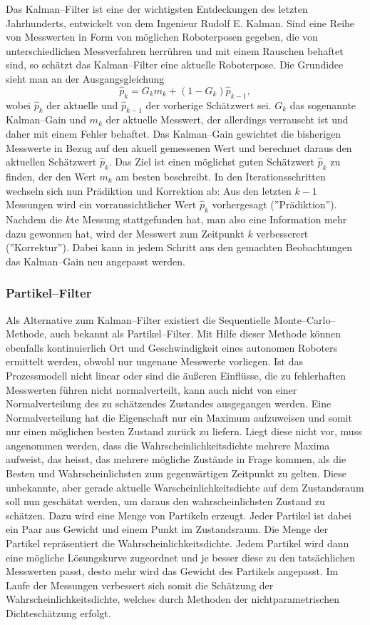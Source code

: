 Das Kalman--Filter ist eine der wichtigsten Entdeckungen des letzten Jahrhunderts, entwickelt von dem Ingenieur Rudolf E. Kalman.
Sind eine Reihe von Messwerten in Form von möglichen Roboterposen gegeben, die von unterschiedlichen Messverfahren herrühren und mit einem Rauschen behaftet sind, so schätzt das Kalman--Filter eine aktuelle Roboterpose.
Die Grundidee sieht man an der Ausgangsgleichung \[ \hat{p}_k = G_k m_k + (1-G_k) \hat{p}_{k-1}, \] wobei \(\hat{p}_k\) der aktuelle und  \(\hat{p}_{k-1}\) der vorherige Schätzwert sei. \(G_k\) das sogenannte Kalman--Gain und \(m_k\) der aktuelle Messwert, der allerdings verrauscht ist und daher mit einem Fehler behaftet. Das Kalman--Gain gewichtet die bisherigen Messwerte in Bezug auf den akuell gemessenen Wert und berechnet daraus den aktuellen Schätzwert \(\hat{p}_k\). Das Ziel ist einen möglichst guten Schätzwert \(\hat{p}_k\) zu finden, der den Wert \(m_k\) am besten beschreibt.
In den Iterationsschritten wechseln sich nun Prädiktion und Korrektion ab: Aus den letzten \(k-1\) Messungen wird ein vorraussichtlicher Wert \(\hat{p}_k\) vorhergesagt (''Prädiktion''). Nachdem die \(k\)te Messung stattgefunden hat, man also eine Information mehr dazu gewonnen hat, wird der Messwert zum Zeitpunkt \(k\) verbesserert (''Korrektur''). Dabei kann in jedem Schritt aus den gemachten Beobachtungen das Kalman--Gain neu angepasst werden.

\subsubsection{Partikel--Filter}

Als Alternative zum Kalman--Filter existiert die Sequentielle
Monte--Carlo--Methode, auch bekannt als Partikel--Filter. Mit Hilfe dieser
Methode können ebenfalls kontinuierlich Ort und Geschwindigkeit eines autonomen Roboters ermittelt werden, obwohl nur ungenaue Messwerte vorliegen.
Ist das Prozessmodell nicht linear oder sind die äußeren Einflüsse, die zu
fehlerhaften Messwerten führen nicht normalverteilt, kann auch nicht von einer
Normalverteilung des zu schätzendes Zustandes ausgegangen werden. Eine
Normalverteilung hat die Eigenschaft nur ein Maximum aufzuweisen und somit nur
einen möglichen besten Zustand zurück zu liefern. Liegt diese nicht vor, muss angenommen werden, dass die Wahrscheinlichkeitsdichte mehrere Maxima aufweist, das heisst, das mehrere mögliche Zustände in Frage kommen, als die Besten und Wahrscheinlichsten zum gegenwärtigen Zeitpunkt zu gelten.
Diese unbekannte, aber gerade aktuelle Warscheinlichkeitsdichte auf dem Zustandsraum soll nun geschätzt werden, um daraus den wahrscheinlichsten Zustand zu schätzen. Dazu wird eine Menge von Partikeln erzeugt. Jeder Partikel ist dabei ein Paar aus Gewicht und einem Punkt im Zustandsraum. Die Menge der Partikel repräsentiert die Wahrscheinlichkeitsdichte.
Jedem Partikel wird dann eine mögliche Lösungskurve zugeordnet und je besser diese zu den tatsächlichen Messwerten passt, desto mehr wird das Gewicht des Partikels angepasst. Im Laufe der Messungen verbessert sich somit die Schätzung der Wahrscheinlichkeitsdichte, welches durch Methoden der nichtparametrischen Dichteschätzung erfolgt.\citep{rob3}


